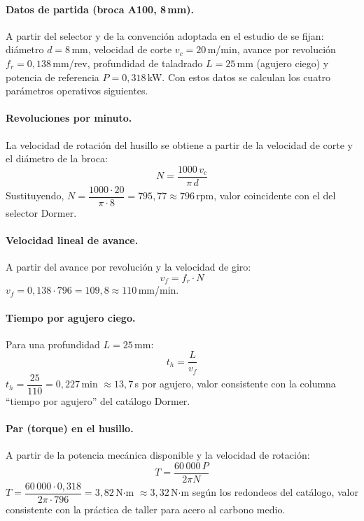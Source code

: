 \documentclass[12pt, letterpaper]{report}
\begin{document}
\paragraph{Datos de partida (broca A100, 8\,mm).}
A partir del selector y de la convención adoptada en el estudio de  se fijan: diámetro $d = 8$\,mm, velocidad de corte $v_c = 20$\,m/min, avance por revolución $f_r = 0{,}138$\,mm/rev, profundidad de taladrado $L = 25$\,mm (agujero ciego) y potencia de referencia $P = 0{,}318$\,kW. Con estos datos se calculan los cuatro parámetros operativos siguientes.

\paragraph{Revoluciones por minuto.}
La velocidad de rotación del husillo se obtiene a partir de la velocidad de corte y el diámetro de la broca:
\begin{equation}
\label{eq:rpm}
N = \frac{1000\, v_c}{\pi\, d}
\end{equation}
Sustituyendo, $N = \dfrac{1000 \cdot 20}{\pi \cdot 8} = 795{,}77 \approx 796$\,rpm, valor coincidente con el del selector Dormer.

\paragraph{Velocidad lineal de avance.}
A partir del avance por revolución y la velocidad de giro:
\begin{equation}
\label{eq:avance-lineal}
v_f = f_r \cdot N
\end{equation}
$v_f = 0{,}138 \cdot 796 = 109{,}8 \approx 110$\,mm/min.

\paragraph{Tiempo por agujero ciego.}
Para una profundidad $L = 25$\,mm:
\begin{equation}
\label{eq:tiempo-agujero}
t_h = \frac{L}{v_f}
\end{equation}
$t_h = \dfrac{25}{110} = 0{,}227$\,min $\approx 13{,}7$\,s por agujero, valor consistente con la columna ``tiempo por agujero'' del catálogo Dormer.

\paragraph{Par (torque) en el husillo.}
A partir de la potencia mecánica disponible y la velocidad de rotación:
\begin{equation}
\label{eq:torque}
T = \frac{60\,000\, P}{2 \pi N}
\end{equation}
$T = \dfrac{60\,000 \cdot 0{,}318}{2\pi \cdot 796} = 3{,}82$\,N$\cdot$m $\approx 3{,}32$\,N$\cdot$m según los redondeos del catálogo, valor consistente con la práctica de taller para acero al carbono medio.
\end{document}
